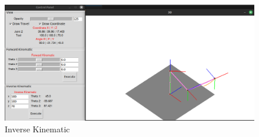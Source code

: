 \begin{figure}[H]
	\centering
	\includegraphics[width=1\linewidth]{Images/inv_demo.png}
	\caption{Inverse Kinematic}
	\label{fig:enter-label9}
\end{figure}